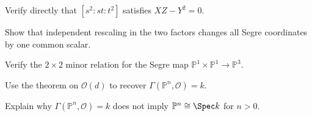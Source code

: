 \begin{exercise}\label{exr:vi36-20}
Verify directly that \([s^2:st:t^2]\) satisfies \(XZ-Y^2=0\).
\end{exercise}

\begin{exercise}\label{exr:vi36-21}
Show that independent rescaling in the two factors changes all Segre coordinates by one common scalar.
\end{exercise}

\begin{exercise}\label{exr:vi36-22}
Verify the \(2\times2\) minor relation for the Segre map \(\mathbb P^1\times\mathbb P^1\to\mathbb P^3\).
\end{exercise}

\begin{exercise}\label{exr:vi36-23}
Use the theorem on \(\mathcal O(d)\) to recover \(\Gamma(\mathbb P^n,\mathcal O)=k\).
\end{exercise}

\begin{exercise}\label{exr:vi36-24}
Explain why \(\Gamma(\mathbb P^n,\mathcal O)=k\) does not imply \(\mathbb P^n\cong\Spec k\) for \(n>0\).
\end{exercise}